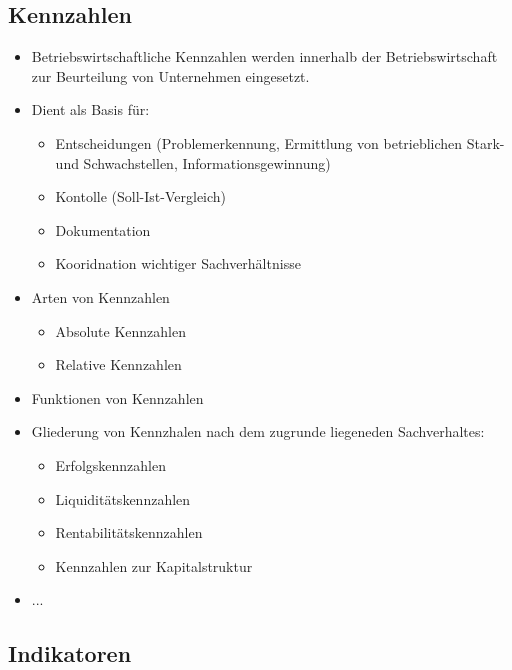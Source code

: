 \subsection{Kennzahlen}

\begin{itemize}
    \item Betriebswirtschaftliche Kennzahlen werden innerhalb der Betriebswirtschaft zur Beurteilung von Unternehmen eingesetzt.

    \item Dient als Basis für:
        \begin{itemize}
                \item Entscheidungen (Problemerkennung, Ermittlung von betrieblichen Stark- und Schwachstellen, Informationsgewinnung)
                        \item Kontolle (Soll-Ist-Vergleich)
            \item Dokumentation
            \item Kooridnation wichtiger Sachverhältnisse
        \end{itemize}

    \item Arten von Kennzahlen
    \begin{itemize}
        \item Absolute Kennzahlen
        \item Relative Kennzahlen
    \end{itemize}

    \item Funktionen von Kennzahlen
    \item Gliederung von Kennzhalen nach dem zugrunde liegeneden Sachverhaltes:
    \begin{itemize}
        \item Erfolgskennzahlen
        \item Liquiditätskennzahlen
        \item Rentabilitätskennzahlen
        \item Kennzahlen zur Kapitalstruktur
    \end{itemize}
    \item ...
\end{itemize}






\subsection{Indikatoren}

